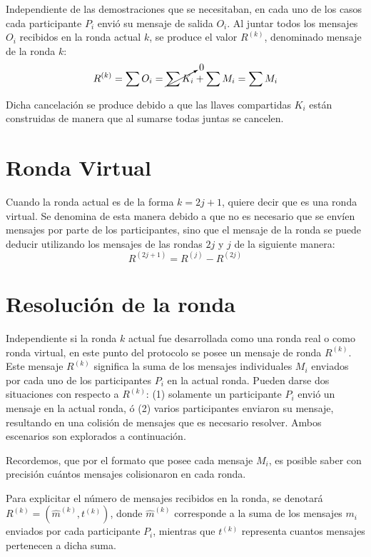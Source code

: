 Independiente de las demostraciones que se necesitaban, en cada uno de los casos cada participante $P_i$ envió su mensaje de salida $O_i$. Al juntar todos los mensajes $O_i$ recibidos en la ronda actual $k$, se produce el valor $R^{(k)}$, denominado mensaje de la ronda $k$: $$R^{(k)} = \sum O_i = \cancelto{0}{\sum K_i} + \sum M_i = \sum M_i$$

Dicha cancelación se produce debido a que las llaves compartidas $K_i$ están construidas de manera que al sumarse todas juntas se cancelen.

\section{Ronda Virtual}

Cuando la ronda actual es de la forma $k = 2j + 1$, quiere decir que es una ronda virtual. Se denomina de esta manera debido a que no es necesario que se envíen mensajes por parte de los participantes, sino que el mensaje de la ronda se puede deducir utilizando los mensajes de las rondas $2j$ y $j$ de la siguiente manera: $$R^{(2j + 1)} = R^{(j)} - R^{(2j)}$$


\section{Resolución de la ronda}

Independiente si la ronda $k$ actual fue desarrollada como una ronda real o como ronda virtual, en este punto del protocolo se posee un mensaje de ronda $R^{(k)}$. Este mensaje $R^{(k)}$ significa la suma de los mensajes individuales $M_i$ enviados por cada uno de los participantes $P_i$ en la actual ronda. Pueden darse dos situaciones con respecto a $R^{(k)}$: (1) solamente un participante $P_i$ envió un mensaje en la actual ronda, ó (2) varios participantes enviaron su mensaje, resultando en una colisión de mensajes que es necesario resolver. Ambos escenarios son explorados a continuación.

Recordemos, que por el formato que posee cada mensaje $M_i$, es posible saber con precisión cuántos mensajes colisionaron en cada ronda.


Para explicitar el número de mensajes recibidos en la ronda, se denotará $R^{(k)} = (\hat{m}^{(k)}, t^{(k)})$, donde $\hat{m}^{(k)}$ corresponde a la suma de los mensajes $m_i$ enviados por cada participante $P_i$, mientras que $t^{(k)}$ representa cuantos mensajes pertenecen a dicha suma.

